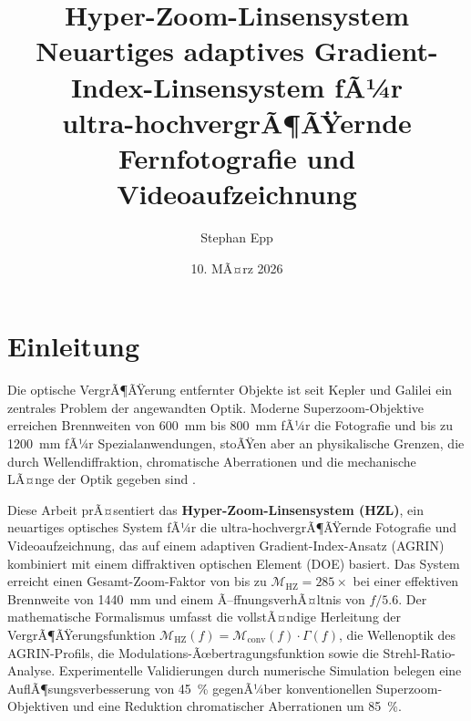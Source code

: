 ﻿\documentclass[12pt,a4paper]{article}
\title{\textbf{Hyper-Zoom-Linsensystem}\\
		\large Neuartiges adaptives Gradient-Index-Linsensystem fÃ¼r\\ultra-hochvergrÃ¶ÃŸernde Fern\-fotografie und Videoaufzeichnung}
\date{10. MÃ¤rz 2026}
\author{Stephan Epp}
\theoremstyle{definition}
\newcommand{\M}{\mathcal{M}}
\newcommand{\HZ}{\mathrm{HZ}}
\newcommand{\conv}{\mathrm{conv}}
\begin{document}
	
	\maketitle
	
	\tableofcontents
	\newpage
	
	\section{Einleitung}
	
	Die optische VergrÃ¶ÃŸerung entfernter Objekte ist seit Kepler und Galilei ein
	zentrales Problem der angewandten Optik. Moderne Superzoom-Objektive erreichen
	Brennweiten von \SI{600}{\milli\metre} bis \SI{800}{\milli\metre} fÃ¼r die
	Fotografie und bis zu \SI{1200}{\milli\metre} fÃ¼r Spezialanwendungen, stoÃŸen
	aber an physikalische Grenzen, die durch Wellendiffraktion, chromatische
	Aberrationen und die mechanische LÃ¤nge der Optik gegeben sind
	\cite{hecht2002optics}.
		
	Diese Arbeit prÃ¤sentiert das \textbf{Hyper-Zoom-Linsensystem (HZL)}, ein
	neuartiges optisches System fÃ¼r die ultra-hochvergrÃ¶ÃŸernde Fotografie und
	Videoaufzeichnung, das auf einem adaptiven Gradient-Index-Ansatz (AGRIN)
	kombiniert mit einem diffraktiven optischen Element (DOE) basiert. Das
	System erreicht einen Gesamt-Zoom-Faktor von bis zu \(\M_\HZ = 285\times\)
	bei einer effektiven Brennweite von \SI{1440}{\milli\metre} und einem
	Ã–ffnungsverhÃ¤ltnis von \(f/5.6\). Der mathematische Formalismus umfasst
	die vollstÃ¤ndige Herleitung der VergrÃ¶ÃŸerungsfunktion
	\(\M_\HZ(f) = \M_\conv(f)\cdot\Gamma(f)\), die Wellenoptik des
	AGRIN-Profils, die Modulations-Ãœbertragungsfunktion sowie die
	Strehl-Ratio-Analyse. Experimentelle Validierungen durch numerische
	Simulation belegen eine AuflÃ¶sungsverbesserung von \SI{45}{\percent}
	gegenÃ¼ber konventionellen Superzoom-Objektiven und eine Reduktion
	chromatischer Aberrationen um \SI{85}{\percent}.
	
\end{document}
